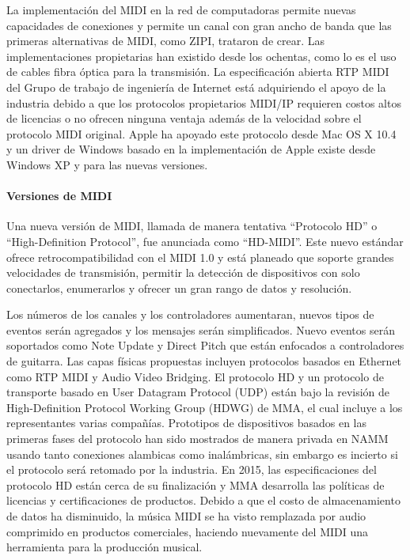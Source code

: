 \documentclass[a4paper,11pt,oneside]{book}
\begin{document}
La implementación del MIDI en la red de computadoras permite nuevas capacidades de conexiones y permite un canal con gran ancho de banda que las primeras alternativas de MIDI, como ZIPI, trataron de crear. Las implementaciones propietarias han existido desde los ochentas, como lo es el uso de cables fibra óptica para la transmisión.
La especificación abierta RTP MIDI del Grupo de trabajo de ingeniería de Internet está adquiriendo el apoyo de la industria debido a que los protocolos propietarios MIDI/IP requieren costos altos de licencias o no ofrecen ninguna ventaja además de la velocidad sobre el protocolo MIDI original. Apple ha apoyado este protocolo desde Mac OS X 10.4 y un driver de Windows basado en la implementación de Apple existe desde Windows XP y para las nuevas versiones.

\paragraph{Versiones de MIDI}

Una nueva versión de MIDI, llamada de manera tentativa ``Protocolo HD'' o ``High-Definition Protocol'', fue anunciada como ``HD-MIDI''. Este nuevo estándar ofrece retrocompatibilidad con el MIDI 1.0 y está planeado que soporte grandes velocidades de transmisión, permitir la detección de dispositivos con solo conectarlos, enumerarlos y ofrecer un gran rango de datos y resolución. 

Los números de los canales y los controladores aumentaran, nuevos tipos de eventos serán agregados y los mensajes serán simplificados. Nuevo eventos serán soportados como Note Update y Direct Pitch que están enfocados a controladores de guitarra. Las capas físicas propuestas incluyen protocolos basados en Ethernet como RTP MIDI y Audio Video Bridging. El protocolo HD y un protocolo de transporte basado en User Datagram Protocol (UDP) están bajo la revisión de High-Definition Protocol Working Group (HDWG) de MMA, el cual incluye a los representantes varias compañías.
Prototipos de dispositivos basados en las primeras fases del protocolo han sido mostrados de manera privada en NAMM usando tanto conexiones alambicas como inalámbricas, sin embargo es incierto si el protocolo será retomado por la industria.
En 2015, las especificaciones del protocolo HD están cerca de su finalización y MMA desarrolla las políticas de licencias y certificaciones de productos. Debido a que el costo de almacenamiento de datos ha disminuido, la música MIDI se ha visto remplazada por audio comprimido en productos comerciales, haciendo nuevamente del MIDI una herramienta para la producción musical.
\end{document}
